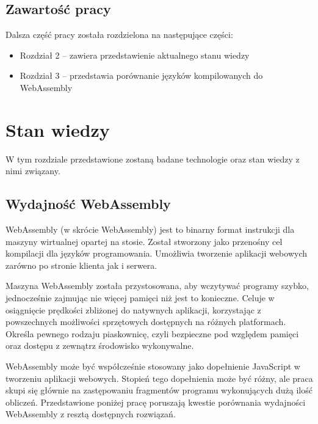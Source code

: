 \documentclass[language=polish,type=master]{aghmodern}
\begin{document}
\section{Zawartość pracy}
Dalsza część pracy została rozdzielona na następujące części:

\begin{itemize}
    \item Rozdział 2 -- zawiera przedstawienie aktualnego stanu wiedzy
    \item Rozdział 3 -- przedstawia porównanie języków kompilowanych do WebAssembly
\end{itemize}

\chapter{Stan wiedzy}
W tym rozdziale przedstawione zostaną badane technologie oraz stan wiedzy z nimi związany.

\section{Wydajność WebAssembly}
WebAssembly (w skrócie WebAssembly) jest to binarny format instrukcji dla maszyny wirtualnej opartej na stosie.
Został stworzony jako przenośny cel kompilacji dla języków programowania.
Umożliwia tworzenie aplikacji webowych zarówno po stronie klienta jak i serwera.

Maszyna WebAssembly została przystosowana, aby wczytywać programy szybko, jednocześnie zajmując nie więcej pamięci niż jest to konieczne.
Celuje w osiągnięcie prędkości zbliżonej do natywnych aplikacji, korzystając z powszechnych możliwości sprzętowych dostępnych na różnych platformach.
Określa pewnego rodzaju piaskownicę\footnotemark{}, czyli bezpieczne pod względem pamięci oraz dostępu z zewnątrz środowisko wykonywalne.

WebAssembly może być współcześnie stosowany jako dopełnienie JavaScript w tworzeniu aplikacji webowych.
Stopień tego dopełnienia może być różny, ale praca skupi się głównie na zastępowaniu fragmentów programu wykonujących dużą ilość obliczeń.
Przedstawione poniżej pracę poruszają kwestie porównania wydajności WebAssembly z resztą dostępnych rozwiązań.
\end{document}
